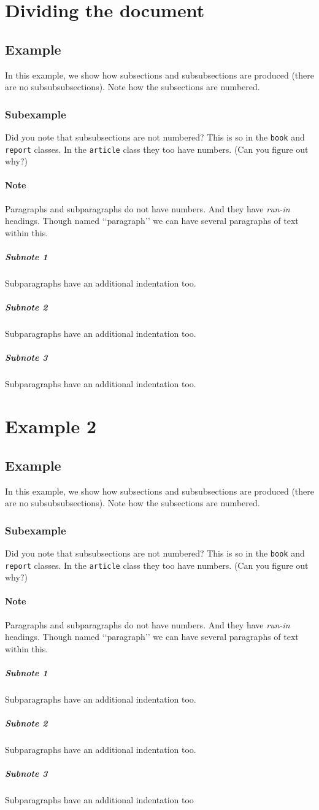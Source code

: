 \documentclass{article}
\theoremstyle{definition}
\theoremstyle{remark}
\theoremstyle{plain}
\numberwithin{equation}{subsection}
\begin{document}
\section{Dividing the document}
\subsection{Example}
In this example, we show how subsections and subsubsections
are produced (there are no subsubsubsections). Note how the
subsections are numbered.
\subsubsection{Subexample}
Did you note that subsubsections are not numbered? This is so in the
\texttt{book} and \texttt{report} classes. In the \texttt{article}
class they too have numbers. (Can you figure out why?)
\paragraph{Note}
Paragraphs and subparagraphs do not have numbers. And they have
\textit{run-in} headings.
Though named ‘‘paragraph’’ we can have several paragraphs of text
within this.
\subparagraph{Subnote 1}
Subparagraphs have an additional indentation too.
\subparagraph{Subnote 2}
Subparagraphs have an additional indentation too.
\subparagraph{Subnote 3}
Subparagraphs have an additional indentation too.

\section{Example 2}
\subsection{Example}
In this example, we show how subsections and subsubsections
are produced (there are no subsubsubsections). Note how the
subsections are numbered.
\subsubsection{Subexample}
Did you note that subsubsections are not numbered? This is so in the
\texttt{book} and \texttt{report} classes. In the \texttt{article}
class they too have numbers. (Can you figure out why?)
\paragraph{Note}
Paragraphs and subparagraphs do not have numbers. And they have
\textit{run-in} headings.
Though named ‘‘paragraph’’ we can have several paragraphs of text
within this.
\subparagraph{Subnote 1}
Subparagraphs have an additional indentation too.
\subparagraph{Subnote 2}
Subparagraphs have an additional indentation too.
\subparagraph{Subnote 3}
Subparagraphs have an additional indentation too
\end{document}
